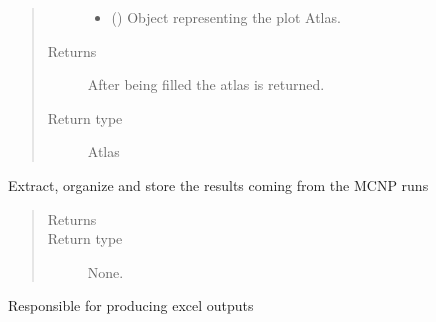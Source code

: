 \documentclass[letterpaper,10pt,english]{sphinxmanual}
\begin{document}
\begin{fulllineitems}
\begin{fulllineitems}
\begin{quote}
\begin{description}
\begin{itemize}
\item {} 
 () \textendash{} Object representing the plot Atlas.

\end{itemize}

\item[{Returns}] \leavevmode
{} \textendash{} After being filled the atlas is returned.

\item[{Return type}] \leavevmode
Atlas

\end{description}\end{quote}

\end{fulllineitems}


\begin{fulllineitems}
\label{\detokenize{api/postprocessing:expoutput.ExperimentalOutput._extract_outputs}}
Extract, organize and store the results coming from the MCNP runs
\begin{quote}\begin{description}
\item[{Returns}] \leavevmode


\item[{Return type}] \leavevmode
None.

\end{description}\end{quote}

\end{fulllineitems}


\begin{fulllineitems}
\label{\detokenize{api/postprocessing:expoutput.ExperimentalOutput._pp_excel_comparison}}
Responsible for producing excel outputs

\end{fulllineitems}


\end{fulllineitems}
\end{document}
